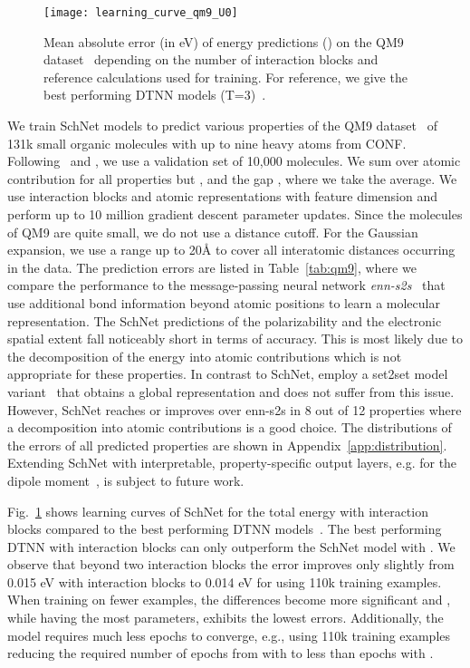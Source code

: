 \documentclass[aip,jcp,reprint,graphicx]{revtex4-1}
\newcommand{\new}[1]{#1}
\begin{document}
\begin{figure}
	\texttt{[image: learning\_curve\_qm9\_U0]}
	\caption{\label{fig:lc_qm9_U0} Mean absolute error (in eV) of energy predictions () on the QM9 dataset~\cite{ramakrishnan2014quantum,blum2009gdb13,reymond2015chemical} depending on the number of interaction blocks and reference calculations used for training. For reference, we give the best performing DTNN models \new{(T=3)}~\citep{schutt2017quantum}.}
\end{figure}

We train SchNet models to predict various properties of the QM9 dataset~\cite{ramakrishnan2014quantum,blum2009gdb13,reymond2015chemical} of 131k small organic molecules with up to nine heavy atoms from CONF.
Following~\citet{gilmer2017neural} and \citet{faber2017fast}, we use a validation set of 10,000 molecules.
We sum over atomic contribution  for all properties but ,  and the gap , where we take the average.
We use  interaction blocks and atomic representations with  feature dimension and perform up to 10 million gradient descent parameter updates.
\new{Since the molecules of QM9 are quite small, we do not use a distance cutoff. For the Gaussian expansion, we use a range up to 20{\AA} to cover all interatomic distances occurring in the data.}
The prediction errors are listed in Table~\ref{tab:qm9}, where we compare the performance to the message-passing neural network \emph{enn-s2s}~\citep{gilmer2017neural} that use additional bond information beyond atomic positions to learn a molecular representation.
The SchNet predictions of the polarizability  and the electronic spatial extent  fall noticeably short in terms of accuracy.
This is most likely due to the decomposition of the energy into atomic contributions which is not appropriate for these properties. 
In contrast to SchNet, \citet{gilmer2017neural} employ a set2set model variant~\citep{vinyals2015order} that obtains a global representation and does not suffer from this issue.
However, SchNet reaches or improves over enn-s2s in 8 out of 12 properties where a decomposition into atomic contributions is a good choice.
\new{The distributions of the errors of all predicted properties are shown in Appendix~\ref{app:distribution}.}
Extending SchNet with interpretable, property-specific output layers, e.g. for the dipole moment~\citep{gastegger2017machine}, is subject to future work.

Fig.~\ref{fig:lc_qm9_U0} shows learning curves of SchNet for the total energy  with  interaction blocks compared to the best performing DTNN models~\citep{schutt2017quantum}.
\new{The best performing DTNN with  interaction blocks can only outperform the SchNet model with .}
We observe that beyond two interaction blocks the error improves only slightly from 0.015 eV with  interaction blocks to 0.014 eV for  using 110k training examples.
When training on fewer examples, the differences become more significant and , while having the most parameters, exhibits the lowest errors.
Additionally, the model requires much less epochs to converge, e.g., using 110k training examples reducing the required number of epochs from  with  to less than  epochs with .
\end{document}
